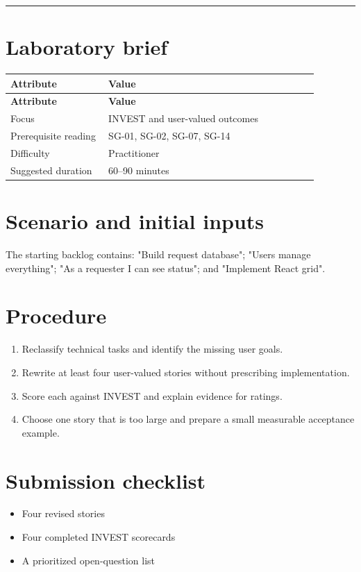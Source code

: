 \documentclass[11pt,letterpaper]{article}
\begin{document}
\tableofcontents\medskip\noindent\rule{\linewidth}{0.4pt}\medskip
\section{Laboratory brief}
\begin{longtable}{|p{0.28\linewidth}|p{0.60\linewidth}|}\hline
\textbf{Attribute} & \textbf{Value} \\ \hline\endfirsthead\hline
\textbf{Attribute} & \textbf{Value} \\ \hline\endhead
Focus & INVEST and user-valued outcomes \\ \hline
Prerequisite reading & SG-01, SG-02, SG-07, SG-14 \\ \hline
Difficulty & Practitioner \\ \hline
Suggested duration & 60–90 minutes \\ \hline
\end{longtable}
\section{Scenario and initial inputs}
The starting backlog contains: "Build request database"; "Users manage everything"; "As a requester I can see status"; and "Implement React grid".

\section{Procedure}
\begin{enumerate}[leftmargin=*,itemsep=3pt]
\item Reclassify technical tasks and identify the missing user goals.
\item Rewrite at least four user-valued stories without prescribing implementation.
\item Score each against INVEST and explain evidence for ratings.
\item Choose one story that is too large and prepare a small measurable acceptance example.
\end{enumerate}
\section{Submission checklist}
\begin{itemize}[leftmargin=*,itemsep=2pt]
\item Four revised stories
\item Four completed INVEST scorecards
\item A prioritized open-question list
\end{itemize}
\end{document}
